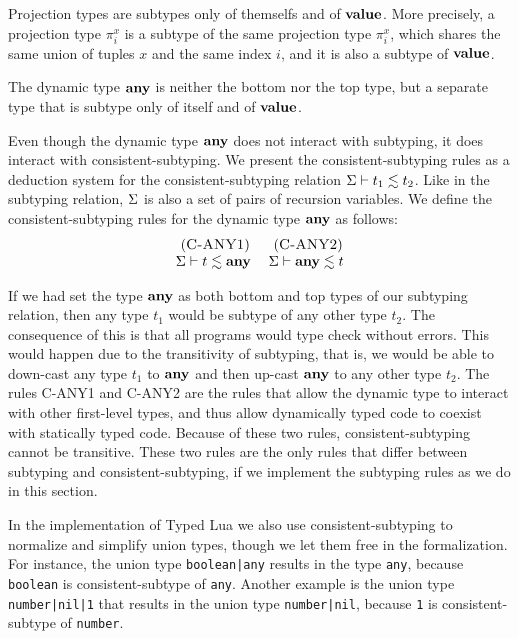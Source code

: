 Projection types are subtypes only of themselfs and of $\mathbf{value}$.
More precisely, a projection type $\pi_{i}^{x}$ is a subtype of the
same projection type $\pi_{i}^{x}$, which shares the same union of
tuples $x$ and the same index $i$, and it is also a subtype of $\mathbf{value}$.

The dynamic type $\mathbf{any}$ is neither the bottom nor the top type,
but a separate type that is subtype only of itself and of $\mathbf{value}$.

Even though the dynamic type $\mathbf{any}$ does not interact with subtyping,
it does interact with consistent-subtyping.
We present the consistent-subtyping rules as a deduction system for
the consistent-subtyping relation $\Sigma \vdash t_{1} \lesssim t_{2}$.
Like in the subtyping relation, $\Sigma$ is also a set of pairs of
recursion variables.
We define the consistent-subtyping rules for the dynamic type $\mathbf{any}$
as follows:
\[
\begin{array}{c}
\begin{array}{c}
\; (\textsc{C-ANY1})\\
\Sigma \vdash t \lesssim \mathbf{any}
\end{array}
\;
\begin{array}{c}
\; (\textsc{C-ANY2})\\
\Sigma \vdash \mathbf{any} \lesssim t
\end{array}
\end{array}
\]

If we had set the type $\mathbf{any}$ as both bottom and top types of our
subtyping relation, then any type $t_{1}$ would be subtype of
any other type $t_{2}$.
The consequence of this is that all programs would type check without errors.
This would happen due to the transitivity of subtyping, that is,
we would be able to down-cast any type $t_{1}$ to $\mathbf{any}$ and then up-cast
$\mathbf{any}$ to any other type $t_{2}$.
The rules \textsc{C-ANY1} and \textsc{C-ANY2} are the rules that
allow the dynamic type to interact with other first-level types,
and thus allow dynamically typed code to coexist with statically
typed code.
Because of these two rules, consistent-subtyping cannot be transitive.
These two rules are the only rules that differ between
subtyping and consistent-subtyping, if we implement the subtyping rules
as we do in this section.

In the implementation of Typed Lua we also use consistent-subtyping to
normalize and simplify union types, though we let them free in the
formalization.
For instance, the union type \texttt{boolean|any} results in the
type \texttt{any}, because \texttt{boolean} is consistent-subtype
of \texttt{any}.
Another example is the union type \texttt{number|nil|1} that
results in the union type \texttt{number|nil}, because
\texttt{1} is consistent-subtype of \texttt{number}.

